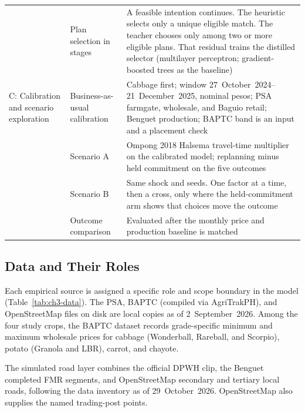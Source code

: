 \documentclass{icsthesis}
\begin{document}
\begin{mainmatter}
\begin{longtable}[l]{@{}>{\raggedright\arraybackslash}p{}>{\raggedright\arraybackslash}p{}>{\raggedright\arraybackslash}p{}@{}}
			 & Plan selection in stages & A feasible intention continues. The heuristic selects only a unique eligible match. The teacher chooses only among two or more eligible plans. That residual trains the distilled selector (multilayer perceptron; gradient-boosted trees as the baseline) \\
			C: Calibration and scenario exploration & Business-as-usual calibration & Cabbage first; window 27~October~2024--21~December~2025, nominal pesos; PSA farmgate, wholesale, and Baguio retail; Benguet production; BAPTC band is an input and a placement check \\
			 & Scenario A & Ompong 2018 Halsema travel-time multiplier on the calibrated model; replanning minus held commitment on the five outcomes \\
			 & Scenario B & Same shock and seeds. One factor at a time, then a cross, only where the held-commitment arm shows that choices move the outcome \\
			 & Outcome comparison & Evaluated after the monthly price and production baseline is matched \\
			\end{longtable}
			\endgroup

		\subsection{Data and Their Roles}

			Each empirical source is assigned a specific role and scope boundary in the model (Table~\ref{tab:ch3-data}). The PSA, BAPTC (compiled via AgriTrakPH), and OpenStreetMap files on disk are local copies as of 2~September~2026. Among the four study crops, the BAPTC dataset records grade-specific minimum and maximum wholesale prices for cabbage (Wonderball, Rareball, and Scorpio), potato (Granola and LBR), carrot, and chayote.

			The simulated road layer combines the official DPWH clip, the Benguet completed FMR segments, and OpenStreetMap secondary and tertiary local roads, following the data inventory as of 29~October~2026. OpenStreetMap also supplies the named trading-post points.


\end{mainmatter}
\end{document}
